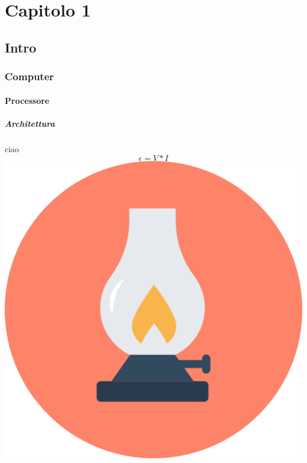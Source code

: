 \newpage
\section{Capitolo 1}
\subsection{Intro}
\subsubsection{Computer}
\paragraph{Processore}
\subparagraph{Architettura}
ciao $$ \epsilon = V * I $$
\includegraphics[scale=0.5]{Immagini/icon.png}
